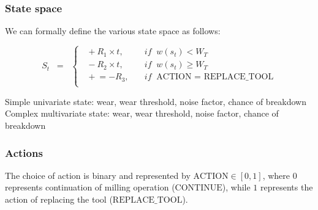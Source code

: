 \documentclass[a4paper, 12pt]{article}
\begin{document}
\subsubsection*{State space}
We can formally define the various state space as follows:

\begin{equation}
	S_t \;\;=\;\;
	\begin{cases}
		\;\;  +R_1 \times t, & \quad if \;\; w(s_t) < W_T\\
		\;\;  -R_2 \times t, & \quad if \;\; w(s_t) \ge W_T\\
		\;\; \mathrel{+}= -R_3, & \quad if \;\; \text{ACTION = REPLACE\_TOOL}\\
	\end{cases}
	\label{eq:StateSpace}
\end{equation}

Simple univariate state: wear, wear threshold, noise factor, chance of breakdown
Complex multivariate state: wear, wear threshold, noise factor, chance of breakdown


\subsubsection*{Actions}
The choice of action is binary and represented by $\text{ACTION} \in [0, 1]$, where $0$ represents continuation of milling operation ($\text{CONTINUE}$), while $1$ represents the action of replacing the tool ($\text{REPLACE\_TOOL}$).
\end{document}

